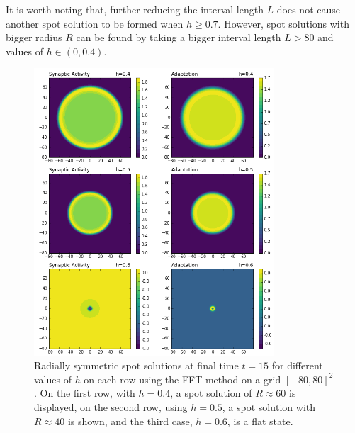 \documentclass{uonmathreport}
\begin{document}
It is worth noting that, further reducing the interval length $L$ does not cause another spot solution to be formed when $h \geq 0.7$. However, spot solutions with bigger radius $R$ can be found by taking a bigger interval length $L > 80$ and values of $h \in (0,0.4)$.
\begin{figure}
	\begin{center}
		\includegraphics[width=0.8\textwidth]{Figures/AdaptFFT_L=80.png}
	\end{center}
	\caption{Radially symmetric spot solutions at final time $t=15$ for different values of $h$ on each row using the FFT method on a grid $[-80, 80]^2$. On the first row, with $h=0.4$, a spot solution of $R \approx 60$ is displayed, on the second row, using $h=0.5$, a spot solution with $R \approx 40$ is shown, and the third case, $h=0.6$, is a flat state.}
	\label{fig:adapt_fft_L_80}
\end{figure}
\end{document}

